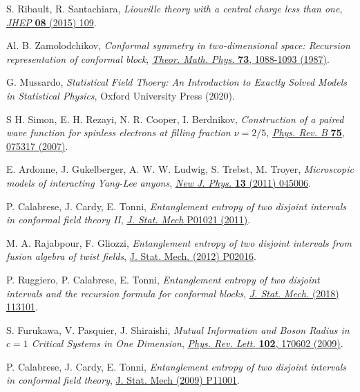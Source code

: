 \documentclass[a4paper,11pt]{article}
\begin{document}
\begin{thebibliography}{99}
 S. Ribault, R. Santachiara, \textit{Liouville theory with a central charge less than one}, 
\href{https://doi.org/10.1007/JHEP08(2015)109}{\emph{JHEP} {\bf 08} (2015) 109}.

 Al. B. Zamolodchikov, \emph{Conformal symmetry in two-dimensional space: Recursion representation of conformal
block}, \href{https://doi.org/10.1007/BF01022967}{\emph{Theor. Math. Phys.} {\bf 73}, 1088-1093  (1987)}.

 G. Mussardo, \emph{Statistical Field Thoery: An Introduction to Exactly Solved Models in Statistical Physics}, Oxford University Press (2020).

 S H. Simon, E. H. Rezayi, N. R. Cooper, I. Berdnikov, \emph{Construction of a paired wave function for spinless electrons at filling fraction $\nu=2/5$}, \href{https://doi.org/10.1103/PhysRevB.75.075317}{\emph{Phys. Rev. B} {\bf 75}, 075317 (2007)}.

 E. Ardonne, J. Gukelberger, A. W. W. Ludwig, S. Trebst, M. Troyer, \emph{Microscopic models of interacting Yang-Lee anyons},
\href{https://doi.org/10.1088/1367-2630/13/4/045006}{\emph{New J. Phys.} {\bf 13} (2011) 045006}.

 P. Calabrese, J. Cardy, E. Tonni, \emph{Entanglement entropy of two disjoint intervals in conformal field theory II}, \href{https://doi.org/10.1088/1742-5468/2011/01/P01021}{\emph{J. Stat. Mech} P01021 (2011)}.

 M. A. Rajabpour, F. Gliozzi, \emph{Entanglement entropy of two disjoint intervals from fusion algebra of twist fields},
\href{https://doi.org/10.1088/1742-5468/2012/02/P02016}{J. Stat. Mech. (2012) P02016}.

 P. Ruggiero, P. Calabrese, E. Tonni, \emph{Entanglement entropy of two disjoint intervals and the recursion formula
for conformal blocks}, \href{https://doi.org/10.1088/1742-5468/aae5a8}{\emph{J. Stat. Mech.} (2018) 113101}.

  S. Furukawa, V. Pasquier, J. Shiraishi, \emph{Mutual Information and Boson Radius in $c=1$ Critical Systems in One Dimension}, \href{https://doi.org/10.1103/PhysRevLett.102.170602}{\emph{Phys. Rev. Lett.} {\bf 102}, 170602 (2009)}.

 P. Calabrese, J. Cardy, E. Tonni, \emph{Entanglement entropy of two disjoint intervals in conformal field theory},
\href{https://doi.org/10.1088/1742-5468/2009/11/P11001}{J. Stat. Mech (2009) P11001}.


\end{thebibliography}
\end{document}
